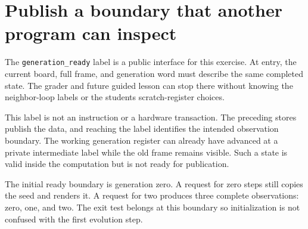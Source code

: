 \section{Publish a boundary that another program can
  inspect}\label{008-life-generations-p05-publish-a-boundary-that-another-program-can-inspect}

The \texttt{generation\_ready} label is a public interface for this
exercise. At entry, the current board, full frame, and generation word
must describe the same completed state. The grader and future guided
lesson can stop there without knowing the neighbor-loop labels or the
student\textquotesingle s scratch-register choices.

This label is not an instruction or a hardware transaction. The
preceding stores publish the data, and reaching the label identifies the
intended observation boundary. The working generation register can
already have advanced at a private intermediate label while the old
frame remains visible. Such a state is valid inside the computation but
is not ready for publication.

The initial ready boundary is generation zero. A request for zero steps
still copies the seed and renders it. A request for two produces three
complete observations: zero, one, and two. The exit test belongs at this
boundary so initialization is not confused with the first evolution
step.
